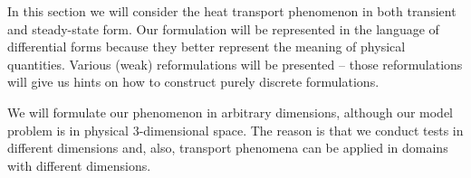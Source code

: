 \begin{discussion}
  In this section we will consider the heat transport phenomenon in both
  transient and steady-state form.
  Our formulation will be represented in the language of differential forms
  because they better represent the meaning of physical quantities.
  Various (weak) reformulations will be presented -- those reformulations will
  give us hints on how to construct purely discrete formulations.

  We will formulate our phenomenon in arbitrary dimensions, although our model
  problem is in physical $3$-dimensional space.
  The reason is that we conduct tests in different dimensions and, also,
  transport phenomena can be applied in domains with different dimensions.
\end{discussion}
